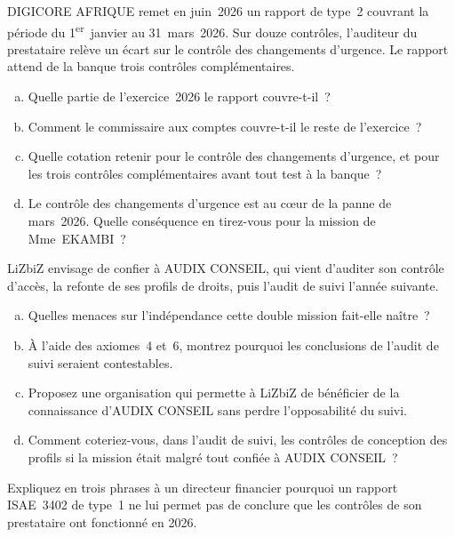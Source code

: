 \begin{boxexo}[title={\ding{45}\quad Exercice~13.2. Lire un rapport ISAE 3402 \niveaumoyen}]
DIGICORE AFRIQUE remet en juin~2026 un rapport de type~2 couvrant la
période du 1\textsuperscript{er}~janvier au 31~mars~2026. Sur douze
contrôles, l'auditeur du prestataire relève un écart sur le contrôle des
changements d'urgence. Le rapport attend de la banque trois contrôles
complémentaires.
\begin{enumerate}[(a)]
    \item Quelle partie de l'exercice~2026 le rapport couvre-t-il~?
    \item Comment le commissaire aux comptes couvre-t-il le reste de
          l'exercice~?
    \item Quelle cotation retenir pour le contrôle des changements
          d'urgence, et pour les trois contrôles complémentaires avant tout
          test à la banque~?
    \item Le contrôle des changements d'urgence est au cœur de la panne de
          mars~2026. Quelle conséquence en tirez-vous pour la mission de
          Mme~EKAMBI~?
\end{enumerate}
\end{boxexo}

\begin{boxexo}[title={\ding{45}\quad Exercice~13.3. L'indépendance à l'épreuve \niveauexpert}]
LiZbiZ envisage de confier à AUDIX CONSEIL, qui vient d'auditer son
contrôle d'accès, la refonte de ses profils de droits, puis l'audit de
suivi l'année suivante.
\begin{enumerate}[(a)]
    \item Quelles menaces sur l'indépendance cette double mission
          fait-elle naître~?
    \item À l'aide des axiomes~4 et~6, montrez pourquoi les conclusions de
          l'audit de suivi seraient contestables.
    \item Proposez une organisation qui permette à LiZbiZ de bénéficier de
          la connaissance d'AUDIX CONSEIL sans perdre l'opposabilité du
          suivi.
    \item Comment coteriez-vous, dans l'audit de suivi, les contrôles de
          conception des profils si la mission était malgré tout confiée à
          AUDIX CONSEIL~?
\end{enumerate}
\end{boxexo}

\bigskip

\begin{boxexo}[title={\ding{45}\quad Exercice~13.4. Type 1 ou type 2~? \niveaubase}]
Expliquez en trois phrases à un directeur financier pourquoi un rapport
ISAE~3402 de type~1 ne lui permet pas de conclure que les contrôles de son
prestataire ont fonctionné en 2026.
\end{boxexo}

